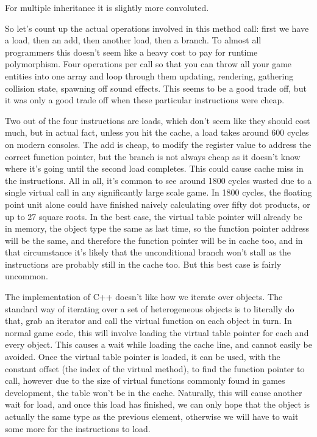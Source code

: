 For multiple inheritance it is slightly more convoluted. 

So let's count up the actual operations involved in this method call: first we
have a load, then an add, then another load, then a branch. To almost all
programmers this doesn't seem like a heavy cost to pay for runtime
polymorphism. Four operations per call so that you can throw all your game
entities into one array and loop through them updating, rendering, gathering
collision state, spawning off sound effects. This seems to be a good trade off,
but it was only a good trade off when these particular instructions were cheap.

Two out of the four instructions are loads, which don't seem like they should
cost much, but in actual fact, unless you hit the cache, a load takes around
600 cycles on modern consoles. The add is cheap, to modify the register value
to address the correct function pointer, but the branch is not always cheap as
it doesn't know where it's going until the second load completes. This could
cause cache miss in the instructions. All in all, it's common to see around
1800 cycles wasted due to a single virtual call in any significantly large
scale game. In 1800 cycles, the floating point unit alone could have finished
naively calculating over fifty dot products, or up to 27 square roots. In the
best case, the virtual table pointer will already be in memory, the object type
the same as last time, so the function pointer address will be the same, and
therefore the function pointer will be in cache too, and in that circumstance
it's likely that the unconditional branch won't stall as the instructions are
probably still in the cache too. But this best case is fairly uncommon.

The implementation of C++ doesn't like how we iterate over objects. The
standard way of iterating over a set of heterogeneous objects is to literally
do that, grab an iterator and call the virtual function on each object in turn.
In normal game code, this will involve loading the virtual table pointer for
each and every object. This causes a wait while loading the cache line, and
cannot easily be avoided. Once the virtual table pointer is loaded, it can be
used, with the constant offset (the index of the virtual method), to find the
function pointer to call, however due to the size of virtual functions
commonly found in games development, the table won't be in the cache.
Naturally, this will cause another wait for load, and once this load has
finished, we can only hope that the object is actually the same type as the
previous element, otherwise we will have to wait some more for the
instructions to load.

